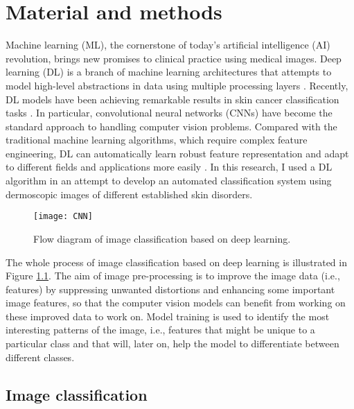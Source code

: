 

\chapter{Material and methods} \label{ch:theory}

Machine learning (ML), the cornerstone of today’s artificial intelligence (AI) revolution, brings new promises to clinical practice using medical images\cite{varoquaux2022machine}. Deep learning (DL) is a branch of machine learning architectures
that attempts to model high-level abstractions in data using
multiple processing layers \cite{han2018classification}.  Recently, DL models have been achieving remarkable results in skin cancer classification tasks \cite{yu2016automated,nie2022recent}. In particular, convolutional neural networks (CNNs) have become the standard approach to handling computer vision problems. Compared with the traditional machine learning algorithms, which require complex feature engineering, DL can automatically learn robust feature representation and adapt to different fields and applications more easily \cite{li2020cnn}. In this research, I used a DL algorithm in an attempt to develop an automated classification system using dermoscopic images of different established skin disorders.


\begin{figure}[!h]
\centering
	\texttt{[image: CNN]}
		\caption{Flow diagram of image classification based on deep learning.}
		\label{Fig:flow} 
\end{figure}

The whole process of image classification based on deep learning is illustrated in Figure \ref{Fig:flow}. The aim of image pre-processing is to improve the image data (i.e., features) by suppressing unwanted distortions and enhancing some important image features, so that the computer vision models can benefit from working on these improved data to work on. Model training is used to identify the most interesting patterns of the image, i.e., features that might be unique to a particular class and that will, later on, help the model to differentiate between different classes. 


\section{Image classification}


